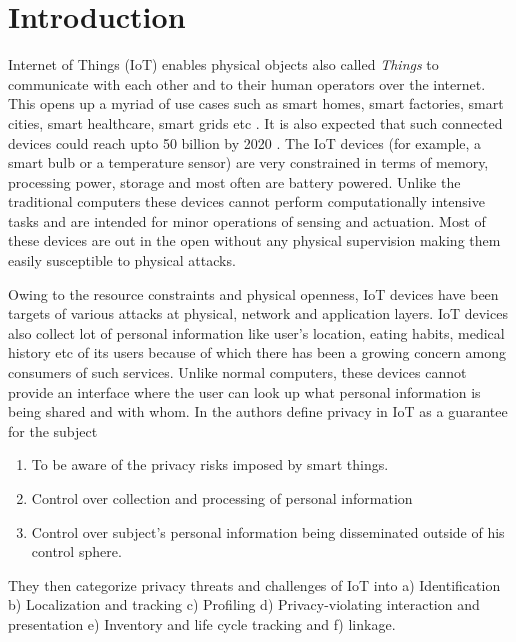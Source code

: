 \documentclass[journal]{IEEEtran}
\begin{document}
\section{Introduction} \label{introduction}

Internet of Things (IoT) enables physical objects also called \textit{Things}  to communicate with each other and to their human operators over the internet. This opens up a myriad of use cases such as smart homes, smart factories, smart cities, smart healthcare, smart grids etc \cite{IoT}. It is also expected that such connected devices could reach upto 50 billion by 2020 \cite{Evans}. The IoT devices (for example, a smart bulb or a temperature sensor) are very constrained in terms of memory, processing power, storage and most often are battery powered. Unlike the traditional computers these devices cannot perform computationally intensive tasks and are intended for minor operations of sensing and actuation. Most of these devices are out in the open without any physical supervision making them easily susceptible to physical attacks.

Owing to the resource constraints and physical openness, IoT devices have been targets of various attacks \cite{iot-sec} at physical, network and application layers. IoT devices also collect lot of personal information like user's location, eating habits, medical history etc of its users because of which there has been a growing concern among consumers of such services. Unlike normal computers, these devices cannot provide an interface where the user can look up what personal information is being shared and with whom. In \cite{Ziegeldorf2014PrivacyIT} the authors define privacy in IoT as a guarantee for the subject	

\begin{enumerate}[label=\alph*)]
	\item To be aware of the privacy risks imposed by smart things.
	\item Control over collection and processing of personal information
	\item Control over subject's personal information being disseminated outside of his control sphere.
\end{enumerate}
They then categorize privacy threats and challenges of IoT into a) Identification b) Localization and tracking c) Profiling d) Privacy-violating interaction and presentation e) Inventory and life cycle tracking and f) linkage.
\end{document}
